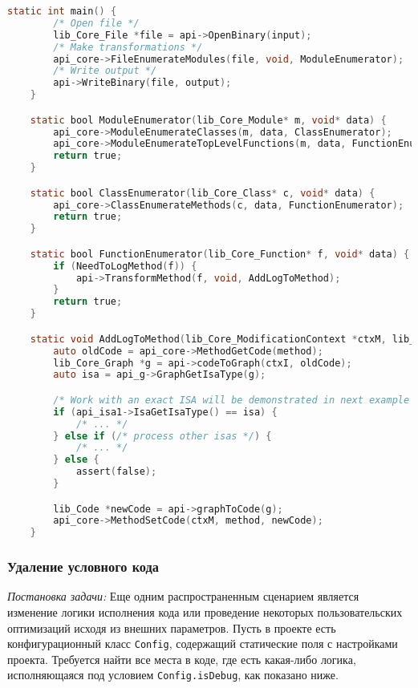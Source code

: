 \begin{lstlisting}[language=C, label=lst:]
    static int main() {
        /* Open file */
        lib_Core_File *file = api->OpenBinary(input);
        /* Make transformations */
        api_core->FileEnumerateModules(file, void, ModuleEnumerator);
        /* Write output */
        api->WriteBinary(file, output);
    }

    static bool ModuleEnumerator(lib_Core_Module* m, void* data) {
        api_core->ModuleEnumerateClasses(m, data, ClassEnumerator);
        api_core->ModuleEnumerateTopLevelFunctions(m, data, FunctionEnumerator)
        return true;
    }

    static bool ClassEnumerator(lib_Core_Class* c, void* data) {
        api_core->ClassEnumerateMethods(c, data, FunctionEnumerator);
        return true;
    }

    static bool FunctionEnumerator(lib_Core_Function* f, void* data) {
        if (NeedToLogMethod(f)) {
            api->TransformMethod(f, void, AddLogToMethod);
        }
        return true;
    }

    static void AddLogToMethod(lib_Core_ModificationContext *ctxM, lib_Core_Function *f, void *data) {
        auto oldCode = api_core->MethodGetCode(method);
        lib_Core_Graph *g = api->codeToGraph(ctxI, oldCode);
        auto isa = api_g->GraphGetIsaType(g);

        /* Work with an exact ISA will be demonstrated in next example */
        if (api_isa1->IsaGetIsaType() == isa) {
            /* ... */
        } else if (/* process other isas */) {
            /* ... */
        } else {
            assert(false);
        }

        lib_Code *newCode = api->graphToCode(g);
        api_core->MethodSetCode(ctxM, method, newCode);
    }
\end{lstlisting}

\subsubsection{Удаление условного кода}

\textit{Постановка задачи:} Еще одним распространенным сценарием является изменение логики исполнения кода или проведение некоторых пользовательских оптимизаций исходя из внешних параметров. Пусть в проекте есть конфигурационный класс \texttt{Config}, содержащий статические поля с настройками проекта. Требуется найти все места в коде, где есть какая-либо логика, исполняющаяся под условием \texttt{Config.isDebug}, как показано ниже.

